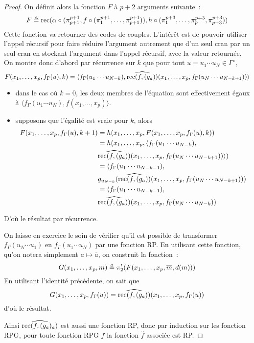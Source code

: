\begin{proof}
  On définit alors la fonction $F$ à $p+2$ arguments suivante~:
  \[F \triangleq
  \operatorname{rec}(\alpha\circ (\pi_{p+1}^{p+1},f\circ (\pi_1^{p+1},\ldots,\pi_{p+1}^{p+1})),
  h\circ (\pi_1^{p+3},\ldots,\pi_p^{p+3},\pi_{p+3}^{p+3}))\]
  Cette fonction va retourner des codes de couples. L'intérêt est de pouvoir
  utiliser l'appel récursif pour faire réduire l'argument autrement que d'un
  seul cran par un seul cran en stockant l'argument dans l'appel récursif,
  avec la valeur retournée. On montre donc d'abord par récurrence sur $k$ que
  pour tout $u = u_1\cdots u_N\in\Gamma^\star$,
  \[F(x_1,\ldots,x_p,f_\Gamma(u),k) = \langle f_\Gamma(u_1\cdots u_{N-k}),
  \widehat{\operatorname{rec}(f,(g_a))}(x_1,\ldots,x_p,f_\Gamma(u_N\cdots u_{N-k+1}))\rangle\]
  \begin{itemize}
  \item dans le cas où $k = 0$, les deux membres de l'équation sont
    effectivement égaux à
    $\langle f_\Gamma(u_1\cdots u_N),\hat f(x_1,\ldots,x_p)\rangle$.
  \item supposons que l'égalité est vraie pour $k$, alors
    \begin{align*}
      F(x_1,\ldots,x_p,f_\Gamma(u),k + 1) &=
      h(x_1,\ldots,x_p,F(x_1,\ldots,x_p,f_\Gamma(u),k))\\
      &= h(x_1,\ldots,x_p,\langle f_\Gamma(u_1\cdots u_{N-k}),\\
      &\widehat{\operatorname{rec}(f,(g_a))}(x_1,\ldots,x_p,f_\Gamma(u_N\cdots u_{N-k+1}))
      \rangle)\\
      &= \langle f_\Gamma(u_1\cdots u_{N-k-1}),\\
      &g_{u_{N-k}}(\widehat{\operatorname{rec}(f,(g_a))}(x_1,\ldots,x_p,
      f_\Gamma(u_N\cdots u_{N-k+1})))\\
      &= \langle f_\Gamma(u_1\cdots u_{N-k-1}),\\
      &\widehat{\operatorname{rec}(f,(g_a))}(x_1,\ldots,x_p,f_\Gamma(u_N\cdots u_{N-k}))
    \end{align*}
  \end{itemize}
  D'où le résultat par récurrence.

  On laisse en exercice le soin de vérifier qu'il est possible de transformer
  $f_\Gamma(u_N\cdots u_1)$ en $f_\Gamma(u_1\cdots u_N)$ par une fonction RP.
  En utilisant cette fonction, qu'on notera simplement $a \mapsto \overline a$,
  on construit la fonction~:
  \[G(x_1,\ldots,x_p,m) \triangleq
  \pi'_2(F(x_1,\ldots,x_p,\overline m,d(m)))\]
  En utilisant l'identité précédente, on sait que
  \[G(x_1,\ldots,x_p,f_\Gamma(u)) =
  \widehat{\operatorname{rec}(f,(g_a))}(x_1,\ldots,x_p,f_\Gamma(u))\]
  d'où le résultat.

  Ainsi $\widehat{\operatorname{rec}(f,(g_a)_a)}$ est aussi une fonction RP, donc par
  induction sur les fonction RPG, pour toute fonction RPG $f$ la fonction
  $\hat f$ associée est RP.
\end{proof}

